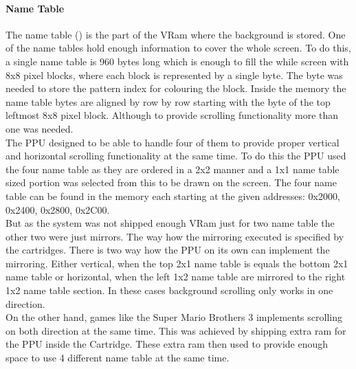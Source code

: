 \documentclass[]{report}
\begin{document}
\paragraph{Name Table}
The name table (\cite{NMTB}) is the part of the VRam where the background is stored. One of the name tables hold enough information to cover the whole screen. To do this, a single name table is 960 bytes long which is enough to fill the while screen with 8x8 pixel blocks, where each block is represented by a single byte. The byte was needed to store the pattern index for colouring the block. Inside the memory the name table bytes are aligned by row by row starting with the byte of the top leftmost 8x8 pixel block. Although to provide scrolling functionality more than one was needed. 
\\
The PPU designed to be able to handle four of them to provide proper vertical and horizontal scrolling functionality at the same time. To do this the PPU used the four name table as they are ordered in a 2x2 manner and a 1x1 name table sized portion was selected from this to be drawn on the screen.
The four name table can be found in the memory each starting at the given addresses: 0x2000, 0x2400, 0x2800, 0x2C00.
\\
 But as the system was not shipped enough VRam just for two name table the other two were just mirrors. The way how the mirroring executed is specified by the cartridges. There is two way how the PPU on its own can implement the mirroring. Either vertical, when the top 2x1 name table is equals the bottom 2x1 name table or horizontal, when the left 1x2 name table are mirrored to the right 1x2 name table section. In these cases background scrolling only works in one direction.
 \\
On the other hand, games like the Super Mario Brothers 3 implements scrolling on both direction at the same time. This was achieved by shipping extra ram for the PPU inside the Cartridge. These extra ram then used to provide enough space to use 4 different name table at the same time.
\end{document}

